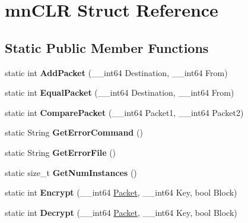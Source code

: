 \hypertarget{structmn_c_l_r}{
\section{mnCLR Struct Reference}
\label{structmn_c_l_r}
}
\subsection*{Static Public Member Functions}
\begin{DoxyCompactItemize}
\item 
\hypertarget{structmn_c_l_r_a66c08a5bfa19b522269743684cf25782}{
static int {\bfseries AddPacket} (\_\-\_\-int64 Destination, \_\-\_\-int64 From)}
\label{structmn_c_l_r_a66c08a5bfa19b522269743684cf25782}

\item 
\hypertarget{structmn_c_l_r_afb1d3d71f0117c9ab533b72edcebbdb4}{
static int {\bfseries EqualPacket} (\_\-\_\-int64 Destination, \_\-\_\-int64 From)}
\label{structmn_c_l_r_afb1d3d71f0117c9ab533b72edcebbdb4}

\item 
\hypertarget{structmn_c_l_r_a4c6c86e3c5cec40dce4b93c43b58d13e}{
static int {\bfseries ComparePacket} (\_\-\_\-int64 Packet1, \_\-\_\-int64 Packet2)}
\label{structmn_c_l_r_a4c6c86e3c5cec40dce4b93c43b58d13e}

\item 
\hypertarget{structmn_c_l_r_a867912a6f885aa0adc7fd574eecfef73}{
static String {\bfseries GetErrorCommand} ()}
\label{structmn_c_l_r_a867912a6f885aa0adc7fd574eecfef73}

\item 
\hypertarget{structmn_c_l_r_a0c2c49cdca4804ca65d7db418fda1b33}{
static String {\bfseries GetErrorFile} ()}
\label{structmn_c_l_r_a0c2c49cdca4804ca65d7db418fda1b33}

\item 
\hypertarget{structmn_c_l_r_a5706b442db0e4d92b51080f15f0422c2}{
static size\_\-t {\bfseries GetNumInstances} ()}
\label{structmn_c_l_r_a5706b442db0e4d92b51080f15f0422c2}

\item 
\hypertarget{structmn_c_l_r_af4f94a45374f3d29c5b7841813cadb21}{
static int {\bfseries Encrypt} (\_\-\_\-int64 \hyperlink{class_packet}{Packet}, \_\-\_\-int64 Key, bool Block)}
\label{structmn_c_l_r_af4f94a45374f3d29c5b7841813cadb21}

\item 
\hypertarget{structmn_c_l_r_a1f81d4e40e3328f884fa9c98b0613e13}{
static int {\bfseries Decrypt} (\_\-\_\-int64 \hyperlink{class_packet}{Packet}, \_\-\_\-int64 Key, bool Block)}
\label{structmn_c_l_r_a1f81d4e40e3328f884fa9c98b0613e13}


\end{DoxyCompactItemize}
